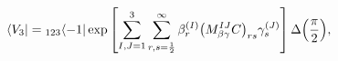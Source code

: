 \begin{equation}
\langle V_3|={}_{123}\langle -1|\exp\left[
\sum_{I,J=1}^{3}\sum_{r,s=\frac12}^{\infty}
\beta_{r}^{(I)}\bigl(M^{IJ}_{\beta\gamma}C\bigr)_{rs}\gamma_s^{(J)}
\right]\Delta\Bigl(\frac{\pi}{2}\Bigr),
\label{Vsgh}
\end{equation}

